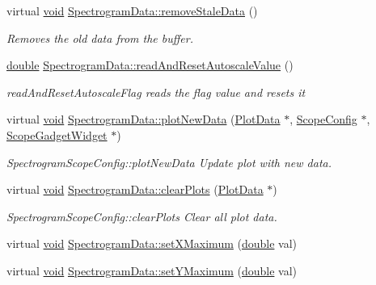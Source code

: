 \begin{DoxyCompactItemize}
virtual \hyperlink{group___u_a_v_objects_plugin_ga444cf2ff3f0ecbe028adce838d373f5c}{void} \hyperlink{group___scope_plugin_ga6e71a34a3e6d00b99845ac4cdfabdde9}{Spectrogram\-Data\-::remove\-Stale\-Data} ()
\begin{DoxyCompactList}\small\item\em Removes the old data from the buffer. \end{DoxyCompactList}\item 
\hyperlink{_super_l_u_support_8h_a8956b2b9f49bf918deed98379d159ca7}{double} \hyperlink{group___scope_plugin_ga5adb8d57b4829f746f7437380b663d72}{Spectrogram\-Data\-::read\-And\-Reset\-Autoscale\-Value} ()
\begin{DoxyCompactList}\small\item\em read\-And\-Reset\-Autoscale\-Flag reads the flag value and resets it \end{DoxyCompactList}\item 
virtual \hyperlink{group___u_a_v_objects_plugin_ga444cf2ff3f0ecbe028adce838d373f5c}{void} \hyperlink{group___scope_plugin_gadfdece3155868e0a61b6a481a663be74}{Spectrogram\-Data\-::plot\-New\-Data} (\hyperlink{class_plot_data}{Plot\-Data} $\ast$, \hyperlink{class_scope_config}{Scope\-Config} $\ast$, \hyperlink{class_scope_gadget_widget}{Scope\-Gadget\-Widget} $\ast$)
\begin{DoxyCompactList}\small\item\em Spectrogram\-Scope\-Config\-::plot\-New\-Data Update plot with new data. \end{DoxyCompactList}\item 
virtual \hyperlink{group___u_a_v_objects_plugin_ga444cf2ff3f0ecbe028adce838d373f5c}{void} \hyperlink{group___scope_plugin_ga3976392eaccf049644001f3e6c7596ad}{Spectrogram\-Data\-::clear\-Plots} (\hyperlink{class_plot_data}{Plot\-Data} $\ast$)
\begin{DoxyCompactList}\small\item\em Spectrogram\-Scope\-Config\-::clear\-Plots Clear all plot data. \end{DoxyCompactList}\item 
virtual \hyperlink{group___u_a_v_objects_plugin_ga444cf2ff3f0ecbe028adce838d373f5c}{void} \hyperlink{group___scope_plugin_ga47ae0c37eea393bc7c83907b6fceb173}{Spectrogram\-Data\-::set\-X\-Maximum} (\hyperlink{_super_l_u_support_8h_a8956b2b9f49bf918deed98379d159ca7}{double} val)
\item 
virtual \hyperlink{group___u_a_v_objects_plugin_ga444cf2ff3f0ecbe028adce838d373f5c}{void} \hyperlink{group___scope_plugin_ga1379bb89fb91d5f6c894fbf000c65cae}{Spectrogram\-Data\-::set\-Y\-Maximum} (\hyperlink{_super_l_u_support_8h_a8956b2b9f49bf918deed98379d159ca7}{double} val)

\end{DoxyCompactItemize}
